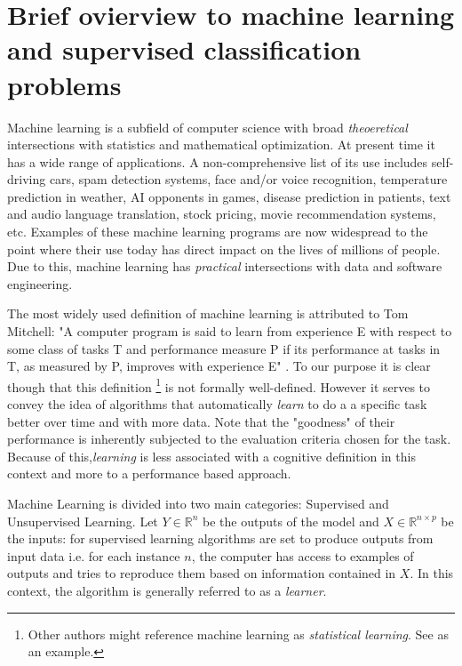 
\section{ Brief ovierview to machine learning and supervised classification problems}\label{section-introduction}

Machine learning is a subfield of computer science with broad \textit{theoeretical} intersections with statistics and mathematical optimization. At present time it has a wide range of applications. A non-comprehensive list of its use includes self-driving cars, spam detection systems, face and/or voice recognition, temperature prediction in weather, AI opponents in games, disease prediction in patients, text and audio language translation, stock pricing, movie recommendation systems, etc. Examples of these machine learning programs are now widespread to the point where their use today has direct impact on the lives of millions of people. Due to this, machine learning has \textit{practical} intersections with data and software engineering.

The most widely used definition of machine learning is attributed to Tom Mitchell: 	 
"A computer program is said to learn from experience E with respect to some class of tasks T and performance measure P if its performance at tasks in T, as measured by P, improves with experience E" \cite{Mitchell-MLearning}. To our purpose it is clear though that this definition \footnote{Other authors might reference machine learning as \textit{statistical learning}. See \cite{hastie-elemstatslearn} as an example.} is not formally well-defined. However it serves to convey the idea of algorithms that automatically \textit{learn} to do a a specific task better over time and with more data. Note that the "goodness" of their performance is inherently subjected to the evaluation criteria chosen for the task. Because of this,\textit{learning} is less associated with a cognitive definition in this context and more to a performance based approach.

Machine Learning is divided into two main categories: Supervised and Unsupervised Learning. Let $Y \in \mathbb{R}^n$ be the outputs of the model and $X \in \mathbb{R}^{n \times  p}$ be the inputs: for supervised learning algorithms are set to produce outputs from input data i.e. for each instance $n$, the computer has access to examples of outputs and tries to reproduce them based on information contained in $X$. In this context, the algorithm is generally referred to as a \textit{learner}.

